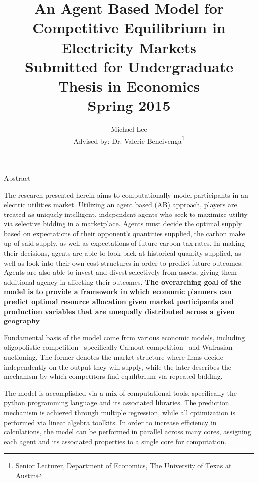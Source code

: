 \documentclass[12pt]{article}
\begin{document}
\title{An Agent Based Model for Competitive Equilibrium in Electricity Markets\\ \small{Submitted for Undergraduate Thesis in Economics\\ Spring 2015}}

\author{Michael Lee \\{\small Advised by: Dr. Valerie Bencivenga\thanks{ Senior Lecturer, Department of Economics, The University of Texas at Austin}}}



\maketitle{}
\thispagestyle{empty}
\newpage{}


\begin{center}Abstract\end{center}

The research presented herein aims to computationally model participants in an electric utilities market. Utilizing an agent based (AB) approach, players are treated as uniquely intelligent, independent agents who seek to maximize utility via selective bidding in a marketplace. Agents must decide the optimal supply based on expectations of their opponent's quantities supplied, the carbon make up of said supply, as well as expectations of future carbon tax rates. In making their decisions, agents are able to look back at historical quantity supplied, as well as look into their own cost structures in order to predict future outcomes. Agents are also able to invest and divest selectively from assets, giving them additional agency in affecting their outcomes. \textbf{{The overarching goal of the model is to provide a framework in which economic planners can predict optimal resource allocation given market participants and production variables that are unequally distributed across a given geography }}  \*

Fundamental basis of the model come from various economic models, including oligopolistic competition-- specifically Carnout competition-- and Walrasian auctioning. The former denotes the market structure where firms decide independently on the output they will supply, while the later describes the mechanism by which competitors find equilibrium via repeated bidding. \*


The model is accomplished via a mix of computational tools, specifically the python programming language and its associated libraries. The prediction mechanism is achieved through multiple regression, while all optimization is performed via linear algebra toolkits. In order to increase efficiency in calculations, the model can be performed in parallel across many cores, assigning each agent and its associated properties to a single core for computation.
\end{document}
